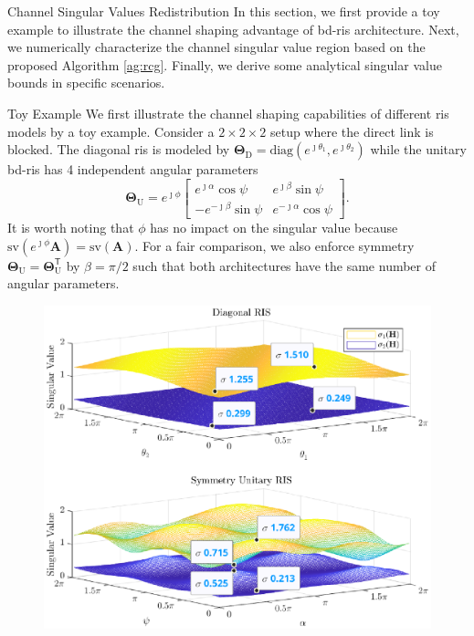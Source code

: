 \documentclass[journal]{IEEEtran}
\begin{document}
\begin{section}{Channel Singular Values Redistribution}
	In this section, we first provide a toy example to illustrate the channel shaping advantage of \gls{bd}-\gls{ris} architecture.
	Next, we numerically characterize the channel singular value region based on the proposed Algorithm \ref{ag:rcg}.
	Finally, we derive some analytical singular value bounds in specific scenarios.
	\begin{subsection}{Toy Example}\label{sc:toy_example}
		We first illustrate the channel shaping capabilities of different \gls{ris} models by a toy example.
		Consider a $2 \times 2 \times 2$ setup where the direct link is blocked.
		The diagonal \gls{ris} is modeled by $\mathbf{\Theta}_\mathrm{D} = \mathrm{diag}(e^{\jmath \theta_1}, e^{\jmath \theta_2})$ while the unitary \gls{bd}-\gls{ris} has 4 independent angular parameters
		\begin{equation}
			\mathbf{\Theta}_\mathrm{U} = e^{\jmath \phi} \begin{bmatrix}
				e^{\jmath \alpha} \cos \psi  & e^{\jmath \beta} \sin \psi   \\
				-e^{-\jmath \beta} \sin \psi & e^{-\jmath \alpha} \cos \psi
			\end{bmatrix}.
			\label{eq:unitary_ris}
		\end{equation}
		It is worth noting that $\phi$ has no impact on the singular value because $\mathrm{sv}(e^{\jmath \phi} \mathbf{A}) = \mathrm{sv}(\mathbf{A})$.
		For a fair comparison, we also enforce symmetry $\mathbf{\Theta}_\mathrm{U} = \mathbf{\Theta}_\mathrm{U}^\mathsf{T}$ by $\beta = \pi / 2$ such that both architectures have the same number of angular parameters.
		\begin{figure}
			\centering
			\includegraphics[width=\columnwidth]{assets/simulation/singular_trend.eps}

\end{figure}
\end{subsection}
\end{section}
\end{document}
